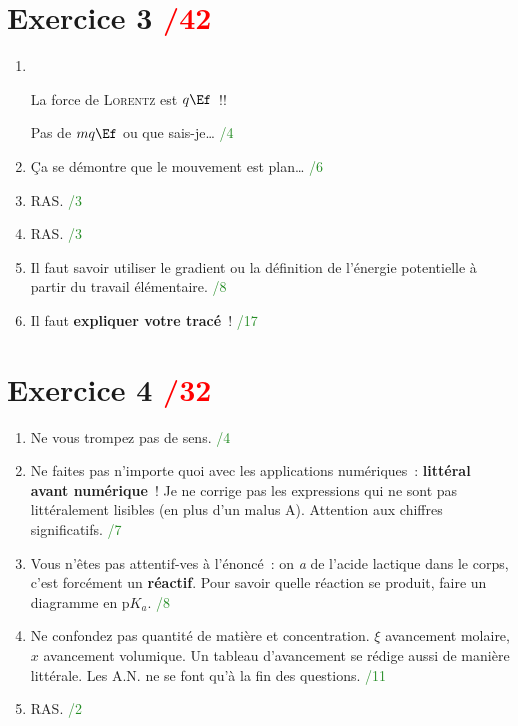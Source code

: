 \documentclass[a4paper, 10pt, final, garamond]{book}
\begin{document}
\section{Exercice 3 \hfill \textcolor{red}{/42}}
\begin{enumerate}
  \item ~
  \begin{framed}
      \begin{center}
          \huge
          La force de \textsc{Lorentz} est $q\Ef$~!!
      \end{center}
  \end{framed}
    Pas de $mq\Ef$ ou que sais-je…
    \hfill \textcolor{ForestGreen}{/4}
  \item Ça se démontre que le mouvement est plan…
    \hfill \textcolor{ForestGreen}{/6}
  \item RAS.
    \hfill \textcolor{ForestGreen}{/3}
  \item RAS.
    \hfill \textcolor{ForestGreen}{/3}
  \item Il faut savoir utiliser le gradient ou la définition de l'énergie
    potentielle à partir du travail élémentaire.
    \hfill \textcolor{ForestGreen}{/8}
  \item Il faut \textbf{expliquer votre tracé}~!
    \hfill \textcolor{ForestGreen}{/17}
\end{enumerate}

\section{Exercice 4 \hfill \textcolor{red}{/32}}
\begin{enumerate}
  \item Ne vous trompez pas de sens.
    \hfill \textcolor{ForestGreen}{/4}
  \item Ne faites pas n'importe quoi avec les applications numériques~:
    \textbf{littéral avant numérique}~! Je ne corrige pas les expressions qui ne
    sont pas littéralement lisibles (en plus d'un malus A). Attention aux
    chiffres significatifs.
    \hfill \textcolor{ForestGreen}{/7}
  \item Vous n'êtes pas attentif-ves à l'énoncé~: on \textit{a} de l'acide
    lactique dans le corps, c'est forcément un \textbf{réactif}. Pour savoir
    quelle réaction se produit, faire un diagramme en p$K_a$.
    \hfill \textcolor{ForestGreen}{/8}
  \item Ne confondez pas quantité de matière et concentration. $\xi$ avancement
    molaire, $x$ avancement volumique. Un tableau d'avancement se rédige aussi
    de manière littérale. Les A.N. ne se font qu'à la fin des questions.
    \hfill \textcolor{ForestGreen}{/11}
  \item RAS.
    \hfill \textcolor{ForestGreen}{/2}
\end{enumerate}
\end{document}
